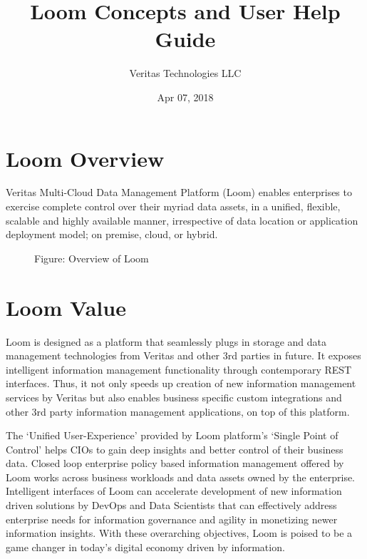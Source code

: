 \documentclass[letterpaper,10pt,english]{sphinxmanual}
\title{Loom Concepts and User Help Guide}
\date{Apr 07, 2018}
\author{Veritas Technologies LLC}
\begin{document}
\maketitle
\sphinxtableofcontents
{}\label{\detokenize{mcdmp_concepts::doc}}



\chapter{Loom Overview}
\label{\detokenize{mcdmp_concepts:content-mcdmp-concepts}}\label{\detokenize{mcdmp_concepts:loom-overview}}\label{\detokenize{mcdmp_concepts:loom-concepts-glossary}}
Veritas Multi-Cloud Data Management Platform (Loom) enables enterprises to exercise complete control over their myriad data assets, in a unified, flexible, scalable and highly available manner, irrespective of data location or application deployment model; on premise, cloud, or hybrid.

\begin{figure}[htbp]
\centering
\capstart

\noindent{}
\caption{Figure: Overview of Loom}\label{\detokenize{mcdmp_concepts:id1}}\end{figure}


\chapter{Loom Value}
\label{\detokenize{mcdmp_concepts:loom-value}}
Loom is designed as a platform that seamlessly plugs in storage and data management technologies from Veritas and other 3rd parties in future. It exposes intelligent information management functionality through contemporary REST interfaces. Thus, it not only speeds up creation of new information management services by Veritas but also enables business specific custom integrations and other 3rd party information management applications, on top of this platform.

The ‘Unified User-Experience’ provided by Loom platform’s ‘Single Point of Control’ helps CIOs to gain deep insights and better control of their business data.  Closed loop enterprise policy based information management offered by Loom works across business workloads and data assets owned by the enterprise.   Intelligent interfaces of Loom can accelerate development of new information driven solutions by DevOps and Data Scientists that can effectively address enterprise needs for information governance and agility in monetizing newer information insights. With these overarching objectives, Loom is poised to be a game changer in today’s digital economy driven by information.
\end{document}
